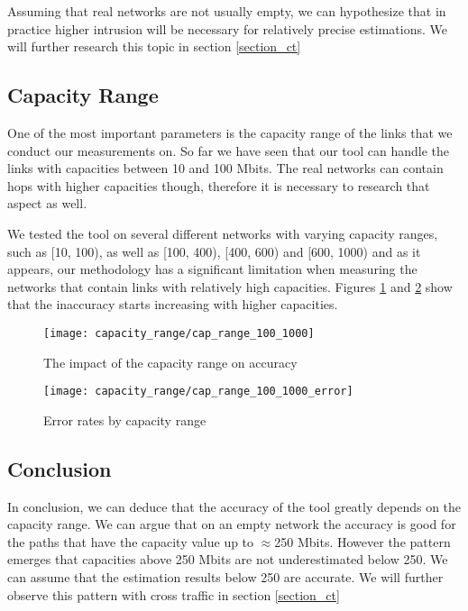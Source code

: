 Assuming that real networks are not usually empty, we can hypothesize that in practice higher intrusion will be necessary for relatively precise estimations. We will further research this topic in section \ref{section_ct}

\subsection{Capacity Range}
One of the most important parameters is the capacity range of the links that we conduct our measurements on. So far we have seen that our tool can handle the links with capacities between 10 and 100 Mbits. The real networks can contain hops with higher capacities though, therefore it is necessary to research that aspect as well.

We tested the tool on several different networks with varying capacity ranges, such as [10, 100), as well as [100, 400), [400, 600) and [600, 1000) and as it appears, our methodology has a significant limitation when measuring the networks that contain links with relatively high capacities. 
Figures \ref{cap_range_all} and \ref{cap_range_all_error} show that the inaccuracy starts increasing with higher capacities.

\begin{figure}[h]
 \centering
 \texttt{[image: capacity\_range/cap\_range\_100\_1000]}
 \caption{The impact of the capacity range on accuracy}
 \label{cap_range_all}
\end{figure}

\begin{figure}[H]
 \centering
 \texttt{[image: capacity\_range/cap\_range\_100\_1000\_error]}
 \caption{Error rates by capacity range}
 \label{cap_range_all_error}
\end{figure}




\subsection*{Conclusion}
In conclusion, we can deduce that the accuracy of the tool greatly depends on the capacity range. We can argue that on an empty network the accuracy is good for the paths that have the capacity value up to $\approx$250 Mbits. However the pattern emerges that capacities above 250 Mbits are not underestimated below 250. We can assume that the estimation results below 250 are accurate.
We will further observe this pattern with cross traffic in section \ref{section_ct}


